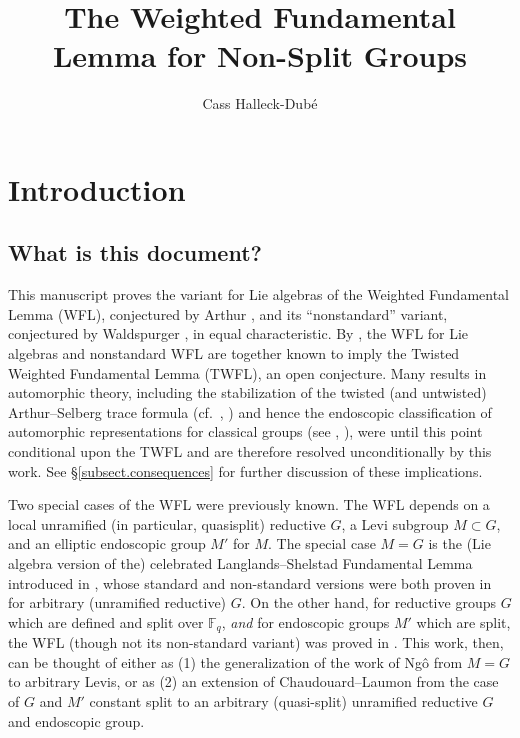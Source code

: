 \documentclass[openany]{amsbook}
\title{The Weighted Fundamental Lemma for Non-Split Groups}
\author{Cass Halleck-Dub\'e}
\theoremstyle{definition}
\theoremstyle{remark}
\numberwithin{equation}{section}
\newcommand{\F}{\mathbb{F}}
\renewcommand{\-}{\operatorname{-}}
\begin{document}



\maketitle
\tableofcontents



\chapter{Introduction}\label{sect.intro}

















\section{What is this document?}

This manuscript proves the variant for Lie algebras of the Weighted Fundamental Lemma (WFL), conjectured by Arthur \cite{ArthurStableI}, and its ``nonstandard'' variant, conjectured by Waldspurger \cite{WaldTordu}, in equal characteristic. By \cite[Theorem 3.8]{WaldTordu}, the WFL for Lie algebras and nonstandard WFL are together known to imply the Twisted Weighted Fundamental Lemma (TWFL), an open conjecture. Many results in automorphic theory, including the stabilization of the twisted (and untwisted) Arthur--Selberg trace formula (cf.\ \cite{ArthurStableI, ArthurStableII, ArthurStableIII}, \cite{MWStabI, MWStabII}) and hence the endoscopic classification of automorphic representations for classical groups (see \cite{ArthurEndoscopic}, \cite{IntertwinersAPackets}), were until this point conditional upon the TWFL and are therefore resolved unconditionally by this work. See \S \ref{subsect.consequences} for further discussion of these implications. 

Two special cases of the WFL were previously known. The WFL depends on a local unramified (in particular, quasisplit) reductive $G$, a Levi subgroup $M \subset G$, and an elliptic endoscopic group $M'$ for $M$. The special case $M = G$ is the (Lie algebra version of the) celebrated Langlands--Shelstad Fundamental Lemma introduced in \cite{langlandsfl}, whose standard and non-standard versions were both proven in \cite{ngofl} for arbitrary (unramified reductive) $G$. On the other hand, for reductive groups $G$ which are defined and split over $\F_q$, \textit{and} for endoscopic groups $M'$ which are split, the WFL (though not its non-standard variant) was proved in \cite{CLI, CLII}. This work, then, can be thought of either as (1) the generalization of the work of Ng\^{o} from $M = G$ to arbitrary Levis, or as (2) an extension of Chaudouard--Laumon from the case of $G$ and $M'$ constant split to an arbitrary (quasi-split) unramified reductive $G$ and endoscopic group. 
\end{document}
